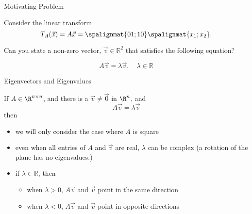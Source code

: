\begin{frame}{Motivating Problem}

    Consider the linear transform 
        $$T_A(\vec x) = A \vec x = \spalignmat{0 1;1 0} \spalignmat{x_1;x_2}.$$

    \pause 
    
    Can you state a non-zero vector, $\vec v \in \mathbb R^2$ that satisfies the following equation? 
    
    $$A \vec v = \lambda \vec v, \quad \lambda \in \mathbb R$$
    

    \pause 

\end{frame}


\begin{frame}{Eigenvectors and Eigenvalues}

    If $A \in \R^{n\times n}$, and there is a $\vec v \neq \vec 0$ in $\R^n$, and
        \[ A\vec v=\lambda \vec v \]
    then  

    \vspace{12pt}
    
    \begin{itemize}
        \item<3-> we will only consider the case where $A$ is square
        \item<4-> even when all entries of $A$ and $\vec v$ are real, $\lambda$ can be complex
        (a rotation of the plane has no  eigenvalues.) 
        \item<5-> if $\lambda \in \mathbb R$, then
        \begin{itemize}
            \item when $\lambda > 0$, $A\vec v$ and $\vec v$ point in the same direction
            \item when $\lambda < 0$, $A\vec v$ and $\vec v$ point in opposite directions
        \end{itemize}    \end{itemize}


\end{frame}



